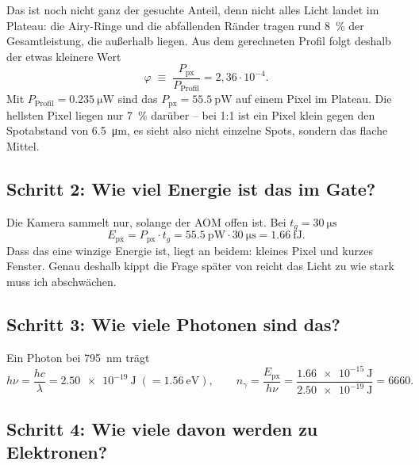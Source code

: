 \documentclass[11pt,a4paper]{article}
\begin{document}
Das ist noch nicht ganz der gesuchte Anteil, denn nicht alles Licht landet im
Plateau: die Airy-Ringe und die abfallenden R\"ander tragen rund \SI{8}{\percent}
der Gesamtleistung, die au\ss{}erhalb liegen. Aus dem gerechneten Profil folgt
deshalb der etwas kleinere Wert
\begin{equation}
  \varphi \;\equiv\; \frac{P_\mathrm{px}}{P_\mathrm{Profil}} = 2{,}36\cdot10^{-4}.
  \label{eq:phi}
\end{equation}
Mit $P_\mathrm{Profil}=\SI{0,235}{\micro\watt}$ sind das
$P_\mathrm{px}=\SI{55,5}{\pico\watt}$ auf einem Pixel im Plateau. Die hellsten
Pixel liegen nur \SI{7}{\percent} dar\"uber -- bei 1:1 ist ein Pixel klein gegen
den Spotabstand von \SI{6,5}{\micro\meter}, es sieht also nicht einzelne Spots,
sondern das flache Mittel.

\subsection*{Schritt 2: Wie viel Energie ist das im Gate?}

Die Kamera sammelt nur, solange der AOM offen ist. Bei $t_g=\SI{30}{\micro\second}$
\begin{equation}
  E_\mathrm{px} = P_\mathrm{px}\cdot t_g = \SI{55,5}{\pico\watt}\cdot\SI{30}{\micro\second}
  = \SI{1,66}{\femto\joule}.
  \label{eq:energie}
\end{equation}
Dass das eine winzige Energie ist, liegt an beidem: kleines Pixel und kurzes
Fenster. Genau deshalb kippt die Frage sp\"ater von \glqq reicht das Licht\grqq{}
zu \glqq wie stark muss ich abschw\"achen\grqq.

\subsection*{Schritt 3: Wie viele Photonen sind das?}

Ein Photon bei \SI{795}{\nano\meter} tr\"agt
\begin{equation}
  h\nu = \frac{hc}{\lambda} = \SI{2,50e-19}{\joule} \;(=\SI{1,56}{\electronvolt}),
  \qquad
  n_\gamma = \frac{E_\mathrm{px}}{h\nu} = \frac{\SI{1,66e-15}{\joule}}{\SI{2,50e-19}{\joule}}
  = 6660 .
  \label{eq:photonen}
\end{equation}

\subsection*{Schritt 4: Wie viele davon werden zu Elektronen?}
\end{document}

